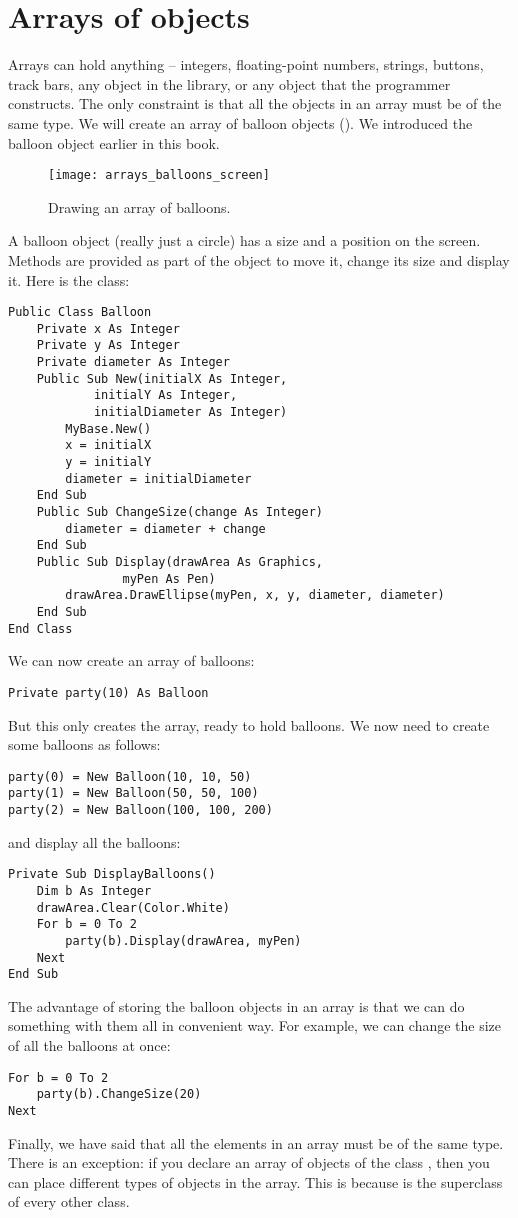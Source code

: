 	\section{Arrays of objects}
		Arrays can hold anything – integers, floating-point numbers, strings, buttons, track bars, any object in the library, or any object that the programmer constructs. The only constraint is that all the objects in an array must be of the same type. We will create an array of balloon objects (). We introduced the balloon object earlier in this book.
		\begin{figure}[bth]
			\centering
			\texttt{[image: arrays\_balloons\_screen]}
			\caption{Drawing an array of balloons.}
			\label{fig:arrays_balloons_screen}
		\end{figure}


		A balloon object (really just a circle) has a size and a position on the screen. Methods are provided as part of the object to move it, change its size and display it. Here is the class:
		\begin{lstlisting}
Public Class Balloon
	Private x As Integer
	Private y As Integer
	Private diameter As Integer
	Public Sub New(initialX As Integer,
			initialY As Integer,
			initialDiameter As Integer)
		MyBase.New()
		x = initialX
		y = initialY
		diameter = initialDiameter
	End Sub
	Public Sub ChangeSize(change As Integer)
		diameter = diameter + change
	End Sub
	Public Sub Display(drawArea As Graphics,
				myPen As Pen)
		drawArea.DrawEllipse(myPen, x, y, diameter, diameter)
	End Sub
End Class
		\end{lstlisting}
		We can now create an array of balloons:
		\begin{lstlisting}
Private party(10) As Balloon
		\end{lstlisting}
		But this only creates the array, ready to hold balloons. We now need to create some balloons as follows:
		\begin{lstlisting}
party(0) = New Balloon(10, 10, 50)
party(1) = New Balloon(50, 50, 100)
party(2) = New Balloon(100, 100, 200)
		\end{lstlisting}
		and display all the balloons:
		\begin{lstlisting}
Private Sub DisplayBalloons()
	Dim b As Integer
	drawArea.Clear(Color.White)
	For b = 0 To 2
		party(b).Display(drawArea, myPen)
	Next
End Sub
		\end{lstlisting}
		The advantage of storing the balloon objects in an array is that we can do something with them all in convenient way. For example, we can change the size of all the balloons at once:
		\begin{lstlisting}
For b = 0 To 2
	party(b).ChangeSize(20)
Next
		\end{lstlisting}
		Finally, we have said that all the elements in an array must be of the same type. There is an exception: if you declare an array of objects of the class , then you can place different types of objects in the array. This is because  is the superclass of every other class.


